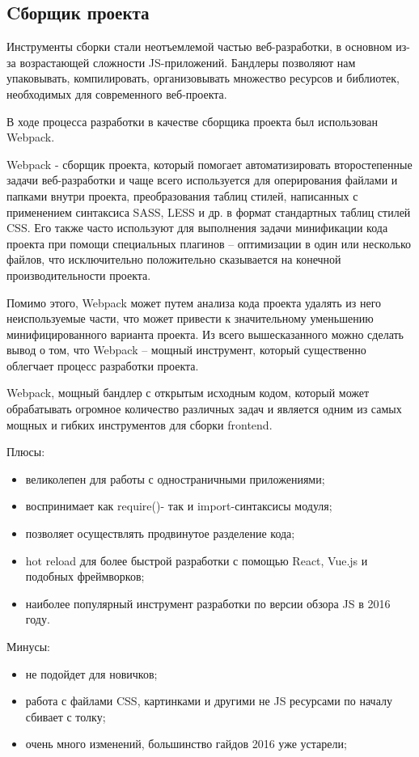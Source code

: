 \subsection{Cборщик проекта}
\label{sec:development:bundler}

Инструменты сборки стали неотъемлемой частью веб-разработки, в основном из-за возрастающей сложности JS-приложений. Бандлеры позволяют нам упаковывать, компилировать, организовывать множество ресурсов и библиотек, необходимых для современного веб-проекта.

В ходе процесса разработки в качестве сборщика проекта был использован Webpack.

Webpack - сборщик проекта, который помогает автоматизировать второстепенные задачи веб-разработки и чаще всего используется для оперирования файлами и папками внутри проекта, преобразования таблиц стилей, написанных с применением синтаксиса SASS, LESS и др. в формат стандартных таблиц стилей CSS. Его также часто используют для выполнения задачи минификации кода проекта при помощи специальных плагинов – оптимизации в один или несколько файлов, что исключительно положительно сказывается на конечной производительности проекта.

Помимо этого, Webpack может путем анализа кода проекта удалять из него неиспользуемые части, что может привести к значительному уменьшению минифицированного варианта проекта. Из всего вышесказанного можно сделать вывод о том, что Webpack – мощный инструмент, который существенно облегчает процесс разработки проекта.

Webpack, мощный бандлер с открытым исходным кодом, который может обрабатывать огромное количество различных задач и является одним из самых мощных и гибких инструментов для сборки frontend. 

Плюсы:

\begin{itemize}
    \item великолепен для работы с одностраничными приложениями;
    \item воспринимает как require()- так и import-синтаксисы модуля;
    \item позволяет осуществлять продвинутое разделение кода;
    \item hot reload для более быстрой разработки с помощью React, Vue.js и подобных  фреймворков;
    \item наиболее популярный инструмент разработки по версии обзора JS в 2016 году.
\end{itemize}

Минусы:

\begin{itemize}
    \item не подойдет для новичков;
    \item работа с файлами CSS, картинками и другими не JS ресурсами по началу сбивает с толку;
    \item очень много изменений, большинство гайдов 2016 уже устарели;
\end{itemize}
